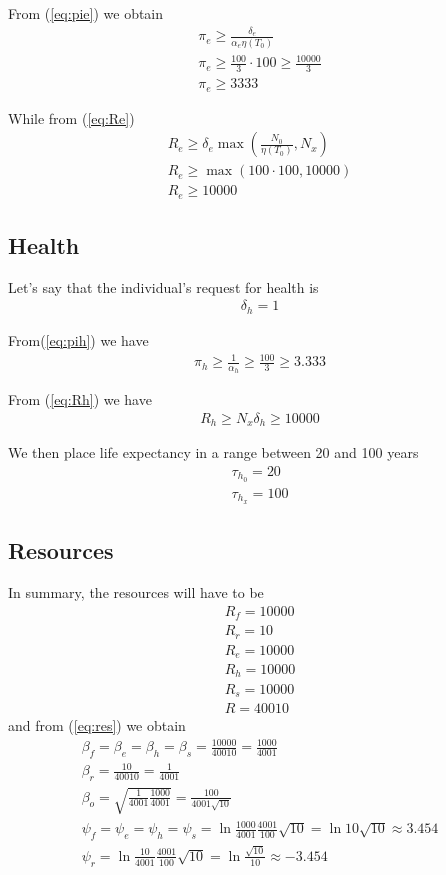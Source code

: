 \documentclass[a4paper,twoside]{article}
\begin{document}
From (\ref{eq:pie}) we obtain
\begin{align*}
	\pi_e \ge \frac{\delta_e}{\alpha_e \eta(T_0)}
	\\
	\pi_e \ge \frac{100}{3} \cdot 100 \ge \frac{10000}{3}
	\\
	\pi_e \ge 3333
\end{align*}

While from (\ref{eq:Re})
\begin{align*}
	R_e \ge \delta_e \max \left( \frac{N_0}{\eta(T_0)}, N_x \right)
	\\
	R_e \ge \max \left( 100 \cdot 100 , 10000 \right)
	\\
	R_e \ge 10000
\end{align*}

\subsection{Health}

Let's say that the individual's request for health is
\begin{align*}
	\delta_h = 1
\end{align*}

From(\ref{eq:pih}) we have
\begin{align*}
	\pi_h \ge \frac{1}{\alpha_h} \ge \frac{100}{3} \ge 3.333
\end{align*}

From (\ref{eq:Rh}) we have
\begin{align*}
	R_h \ge N_x \delta_h \ge 10000
\end{align*}

We then place life expectancy in a range between 20 and 100 years
\begin{align*}
	\tau_{h_0} = 20
	\\
	\tau_{h_x} = 100
\end{align*}

\subsection{Resources}

In summary, the resources will have to be
\begin{align*}
	R_f = 10000
	\\
	R_r = 10
	\\
	R_e = 10000
	\\
	R_h = 10000
	\\
	R_s = 10000
	\\
	R = 40010
\end{align*}
and from (\ref{eq:res}) we obtain
\begin{align*}
	\beta_f = \beta_e = \beta_h = \beta_s = \frac{10000}{40010} = \frac{1000}{4001}
	\\
	\beta_r = \frac{10}{40010} = \frac{1}{4001}
	\\
	\beta_o = \sqrt{\frac{1}{4001} \frac{1000}{4001}}=\frac{100}{4001 \sqrt{10}}
	\\
	\psi_f = \psi_e = \psi_h = \psi_s = \ln \frac{1000}{4001} \frac{4001}{100} \sqrt{10}
	= \ln 10 \sqrt{10} \approx 3.454
	\\
	\psi_r = \ln \frac{10}{4001} \frac{4001}{100} \sqrt{10}
	= \ln \frac{\sqrt{10}}{10} \approx -3.454
\end{align*}
\end{document}

